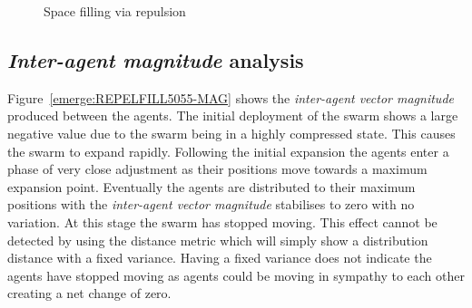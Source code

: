 \begin{figure}[H]
{	 \label{emerge:Repel52-5}
}
\caption{Space filling via repulsion}
\label{emerge:SwarmFloodRepel}
\end{figure}

\subsection{\textit{Inter-agent magnitude} analysis}
Figure~\ref{emerge:REPELFILL5055-MAG} shows the \textit{inter-agent vector magnitude} produced between the agents. The initial deployment of the swarm shows a large negative value due to the swarm being in a highly compressed state. This causes the swarm to expand rapidly. Following the initial expansion the agents enter a phase of very close adjustment as their positions move towards a maximum expansion point. Eventually the agents are distributed to their maximum positions with the \textit{inter-agent vector magnitude} stabilises to zero with no variation. At this stage the swarm has stopped moving. This effect cannot be detected by using the distance metric which will simply show a distribution distance with a fixed variance. Having a fixed variance does not indicate the agents have stopped moving as agents could be moving in sympathy to each other creating a net change of zero.

